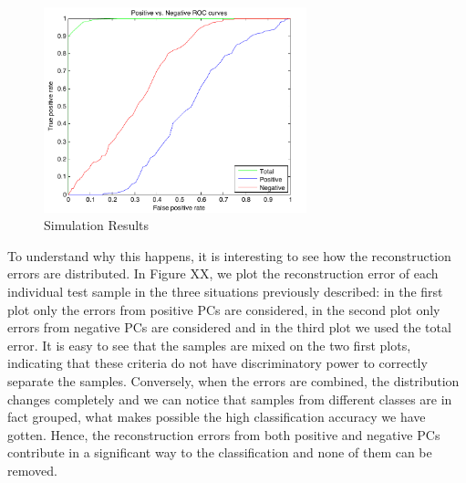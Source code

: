 \documentclass[10pt, conference, compsocconf]{IEEEtran}
\begin{document}
\begin{figure}[t]
\centering
\includegraphics[width=3in]{roc_pos_vs_neg}
\caption{Simulation Results}
\label{roc_pos_vs_neg}
\end{figure}

To understand why this happens, it is interesting to see how the reconstruction errors are distributed. In Figure XX, we plot the reconstruction error of each individual test sample in the three situations previously described: in the first plot only the errors from positive PCs are considered, in the second plot only errors from negative PCs are considered and in the third plot we used the total error. It is easy to see that the samples are mixed on the two first plots, indicating that these criteria do not have discriminatory power to correctly separate the samples. Conversely, when the errors are combined, the distribution changes completely and we can notice that samples from different classes are in fact grouped, what makes possible the high classification accuracy we have gotten. Hence, the reconstruction errors from both positive and negative PCs contribute in a significant way to the classification and none of them can be removed.
\end{document}
